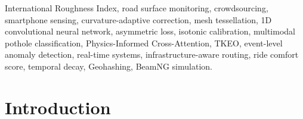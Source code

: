 \documentclass[conference]{IEEEtran}
\begin{document}
\begin{abstract}
This kinematic feature is fused with a synchronised dashcam frame via a Physics-Informed Cross-Attention (PICA) layer whose attention weights are explicitly conditioned on vehicle speed and kinetic energy regime, enforcing physical scaling constraints on the multimodal fusion.
A Hunter penalty term within the focal loss prevents false positives from hard-braking events.
The dual-modality system---continuous IRI regression and event-level pothole classification---is unified in a single deployed Android application, backed by a Node.js platform that provides sub-second real-time map updates via Geohash-partitioned WebSocket broadcasting and quality-aware multimodal route planning.
\end{abstract}

\begin{IEEEkeywords}
International Roughness Index, road surface monitoring, crowdsourcing, smartphone sensing, curvature-adaptive correction, mesh tessellation, 1D convolutional neural network, asymmetric loss, isotonic calibration, multimodal pothole classification, Physics-Informed Cross-Attention, TKEO, event-level anomaly detection, real-time systems, infrastructure-aware routing, ride comfort score, temporal decay, Geohashing, BeamNG simulation.
\end{IEEEkeywords}

\section{Introduction}
\end{document}
